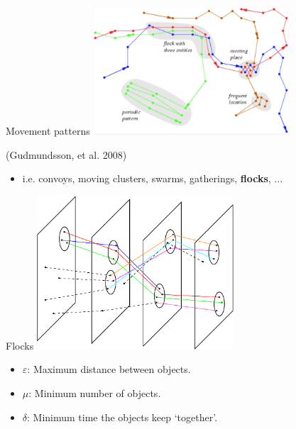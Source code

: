\documentclass{beamer}
\begin{document}
    \begin{frame}{Movement patterns}
        \centering
        \includegraphics[width=0.55\textwidth]{figures/patterns}
        \begin{flushright}
            {\tiny (Gudmundsson, et al. 2008)}
        \end{flushright}


        \begin{itemize} \item i.e. convoys, moving clusters, swarms, gatherings, \textbf{flocks}, ... \end{itemize} \vspace{0.5cm}
    \end{frame}

    \begin{frame}{Flocks}
        \centering
        \includegraphics[width=0.55\textwidth]{figures/flock}

        \begin{itemize}
            \item $\varepsilon$: Maximum distance between objects.
            \item $\mu$: Minimum number of objects.
            \item $\delta$: Minimum time the objects keep `together'.
        \end{itemize}
    \end{frame}
\end{document}
